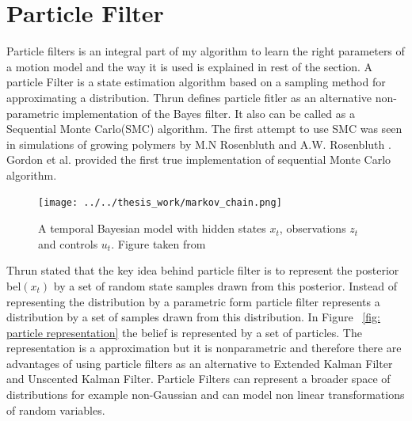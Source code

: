 \documentclass[12pt]{dalcsthesis}
\begin{document}
\section{Particle Filter}
Particle filters is an integral part of my algorithm to learn the right parameters of a motion model and the way it is used is explained in rest of the section. A particle Filter is a state estimation algorithm based on a sampling method for approximating a distribution. Thrun \cite{thrun2005probabilistic} defines particle fitler as an alternative non-parametric implementation of the Bayes filter. It also can be called as a Sequential Monte Carlo(SMC) algorithm. The first attempt to use SMC was seen in simulations of growing polymers by M.N Rosenbluth and A.W. Rosenbluth \cite{rosenbluth1955monte}. Gordon et al. \cite{gordon1993novel} provided the first true implementation of sequential Monte Carlo algorithm. 

\begin{figure}
  \centering
     {\texttt{[image: ../../thesis\_work/markov\_chain.png]}}
  \caption{\label{fig-Markov Chain} A temporal Bayesian model with hidden states $x_{t}$, observations $z_{t}$ and controls $u_{t}$. Figure taken from \cite{thrun2005probabilistic}}
\end{figure}

Thrun \cite{thrun2005probabilistic} stated that the key idea behind particle filter is to represent the posterior bel$(x_{t})$ by a set of random state samples drawn from this posterior. Instead of representing the distribution by a parametric form particle filter represents a distribution by a set of samples drawn from this distribution. In Figure ~\ref{fig: particle representation} the belief is represented by a set of particles. The representation is a approximation but it is nonparametric and therefore there are advantages of using particle filters as an alternative to Extended Kalman Filter and Unscented Kalman Filter. Particle Filters can represent a broader space of distributions for example non-Gaussian and can model non linear transformations of random variables. 

	
\end{document}
